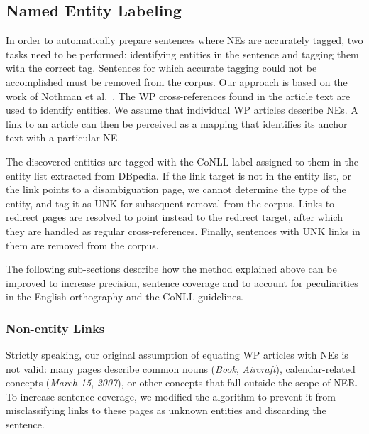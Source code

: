 \documentclass[11pt]{article}
\begin{document}

\subsection{Named Entity Labeling}

In order to automatically prepare sentences where NEs are accurately tagged,
two tasks need to be performed: identifying entities in the sentence and
tagging them with the correct tag. Sentences for which accurate tagging could
not be accomplished must be removed from the corpus. Our approach is based on
the work of Nothman et al.~. The WP cross-references
found in the article text are used to identify entities. We assume that
individual WP articles describe NEs. A link to an article can then be
perceived as a mapping that identifies its anchor text with a particular NE.

The discovered entities are tagged with the CoNLL label assigned to them in
the entity list extracted from DBpedia. If the link target is not in the
entity list, or the link points to a disambiguation page, we cannot determine
the type of the entity, and tag it as UNK for subsequent removal from the
corpus. Links to redirect pages are resolved to point instead to the redirect
target, after which they are handled as regular cross-references. Finally, sentences with UNK links in them are removed from the corpus.

The following sub-sections describe how the method explained above can be
improved to increase precision, sentence coverage and to account for
peculiarities in the English orthography and the CoNLL guidelines.

\subsubsection{Non-entity Links}

Strictly speaking, our original assumption of equating WP articles with NEs is not valid: many pages describe common nouns (\textit{Book}, \textit{Aircraft}), calendar-related concepts (\textit{March 15}, \textit{2007}), or other concepts that fall outside the scope of NER. To increase sentence coverage, we modified the algorithm to prevent it from misclassifying links to these pages as unknown entities and discarding the sentence.
\end{document}
